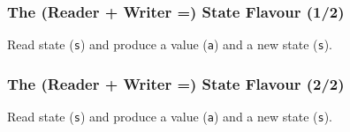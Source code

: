 \newcommand{\explainState}[0]{%
  \vspace{\fill}

  \begin{center}

  Read state (\texttt{s}) and produce a value (\texttt{a}) and a new state
(\texttt{s}).

  \end{center}

  \vspace{\fill}
}

\begin{frame}[fragile]

\frametitle{The (Reader + Writer =) State Flavour (1/2)}

\explainState{}




\vspace{\fill}

\end{frame}


\begin{frame}

\frametitle{The (Reader + Writer =) State Flavour (2/2)}

\explainState{}



\vspace{\fill}

\end{frame}




%


